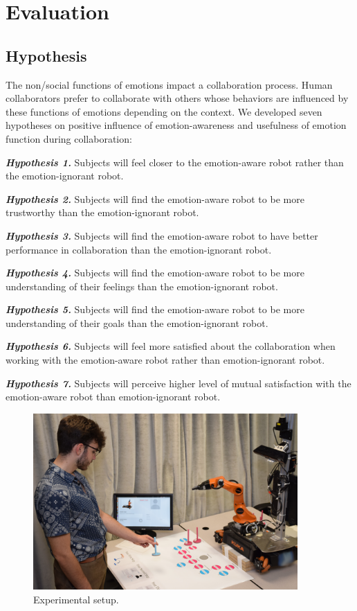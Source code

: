 \documentclass[12pt]{report}
\begin{document}
\section{Evaluation}
\subsection{Hypothesis}

The non/social functions of emotions impact a collaboration process. Human
collaborators prefer to collaborate with others whose behaviors are influenced
by these functions of emotions depending on the context. We developed seven
hypotheses on positive influence of emotion-awareness and usefulness of emotion
function during collaboration:

\textit{\textbf{Hypothesis 1.}} Subjects will feel closer to the emotion-aware
robot rather than the emotion-ignorant robot.

\textit{\textbf{Hypothesis 2.}} Subjects will find the emotion-aware robot to be
more trustworthy than the emotion-ignorant robot.

\textit{\textbf{Hypothesis 3.}} Subjects will find the emotion-aware robot to
have better performance in collaboration than the emotion-ignorant robot.

\textit{\textbf{Hypothesis 4.}} Subjects will find the emotion-aware robot to be
more understanding of their feelings than the emotion-ignorant robot.

\textit{\textbf{Hypothesis 5.}} Subjects will find the emotion-aware robot to be
more understanding of their goals than the emotion-ignorant robot.

\textit{\textbf{Hypothesis 6.}} Subjects will feel more satisfied about the
collaboration when working with the emotion-aware robot rather than
emotion-ignorant robot.

\textit{\textbf{Hypothesis 7.}} Subjects will perceive higher level of mutual
satisfaction with the emotion-aware robot than emotion-ignorant robot.

\begin{figure}
  \centering
  \includegraphics[width=0.9\textwidth]{figure/environment.png}
  \caption{\fontsize{10}{10}\selectfont Experimental setup.}
  \label{fig:environment}
\end{figure}
\end{document}

